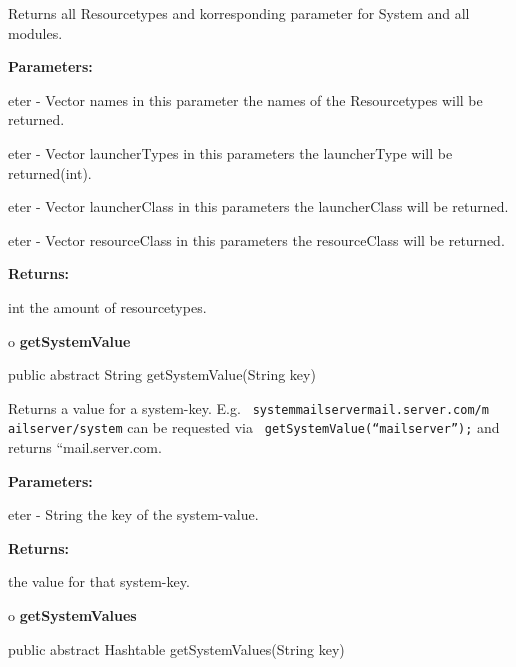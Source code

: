 \begin{description}
\htmlDD Returns all Resourcetypes and korresponding parameter for System and
all modules. 

\begin{description}
\item {\bf Parameters:}  

eter - Vector names in this parameter the names of the Resourcetypes will be
returned.  

eter - Vector launcherTypes in this parameters the launcherType will be
returned(int).  

eter - Vector launcherClass in this parameters the launcherClass will be
returned.  

eter - Vector resourceClass in this parameters the resourceClass will be
returned.  
\item {\bf Returns:}  

int the amount of resourcetypes.  
\end{description}

\end{description}

o {\bf getSystemValue} 

\begin{PRE}
 public abstract String getSystemValue(String key)
\end{PRE}

\begin{description}
\htmlDD Returns a value for a system-key. E.g. {\tt
{\htmlLt}system{\htmlGt}{\htmlLt}mailserver{\htmlGt}mail.server.com{\htmlLt}/m%
ailserver{\htmlGt}{\htmlLt}/system{\htmlGt}} can be requested via {\tt
getSystemValue(``mailserver'');} and returns ``mail.server.com. 

\begin{description}
\item {\bf Parameters:}  

eter - String the key of the system-value.  
\item {\bf Returns:}  

the value for that system-key.  
\end{description}

\end{description}

o {\bf getSystemValues} 

\begin{PRE}
 public abstract Hashtable getSystemValues(String key)
\end{PRE}

